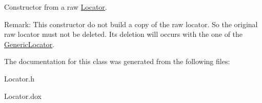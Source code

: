 Constructor from a raw \mbox{\hyperlink{classHurricane_1_1Locator}{Locator}}.

\begin{DoxyParagraph}{Remark\+: This constructor do not build a copy of the raw locator. So the original}
raw locator must not be deleted. It\textquotesingle{}s deletion will occurs with the one of the \mbox{\hyperlink{classHurricane_1_1GenericLocator}{Generic\+Locator}}. 
\end{DoxyParagraph}


The documentation for this class was generated from the following files\+:\begin{DoxyCompactItemize}
\item 
Locator.\+h\item 
Locator.\+dox\end{DoxyCompactItemize}

